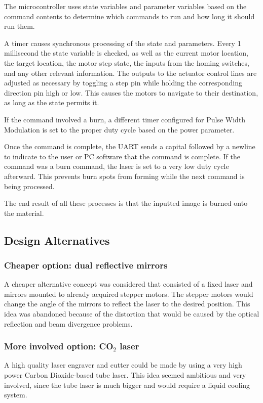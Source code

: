 \documentclass[11pt]{LaTeX-Classes/math-hw}
\begin{document}
The microcontroller uses state variables and parameter variables based on the command contents to determine which commands
to run and how long it should run them.

A timer causes synchronous processing of the state and parameters. Every 1 millisecond
the state variable is checked, as well as the current motor location, the target location,
the motor step state, the inputs from the homing switches, and any other relevant information.
The outputs to the actuator control lines are adjusted as necessary by toggling a step pin while
holding the corresponding direction pin high or low.
This causes the motors to navigate to their destination, as long as the state permits it.

If the command involved a burn, a different timer configured for Pulse Width Modulation is set
to the proper duty cycle based on the power parameter.

Once the command is complete, the UART sends a capital  followed by a newline
to indicate to the user or PC software that the command is complete.
If the command was a burn command, the laser is set to a very low duty cycle afterward. This prevents
burn spots from forming while the next command is being processed.

The end result of all these processes is that the inputted image is burned onto the material.

\subsection{Design Alternatives}
\subsubsection{Cheaper option: dual reflective mirrors}
A cheaper alternative concept was considered that consisted of a fixed laser and
mirrors mounted to already acquired stepper motors. The stepper motors would change the angle of the mirrors to reflect
the laser to the desired position. This idea was abandoned because of the distortion
that would be caused by the optical reflection and beam divergence problems.

\subsubsection{More involved option: CO$_2$ laser}
A high quality laser engraver and cutter could be made by using a very high power Carbon Dioxide-based
tube laser. This idea seemed ambitious and very involved, since the tube laser is much bigger
and would require a liquid cooling system.
\end{document}
